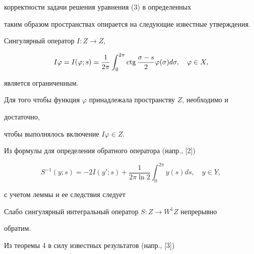 корректности задачи решения уравнения (3) в определенных 


таким образом пространствах опирается на следующие известные утверждения. 


 


\begin{lemnonum} 


Сингулярный оператор $I:Z\to Z$, 


$$ 


I\varphi=I(\varphi;s)=\frac{1}{2\pi}\int^{2\pi}_0 


\ctg\frac{\sigma-s}{2}\varphi(\sigma)d\sigma,\quad 


\varphi\in X, 


$$ 


является ограниченным. 


\end{lemnonum} 


 


\begin{cornonum} 


Для того чтобы функция $\varphi$ принадлежала пространству $Z$, необходимо и 


достаточно, 


чтобы выполнялось включение $I\varphi\in Z$. 


\end{cornonum} 


 


Из формулы для определения обратного оператора (напр., [2]) 


$$ 


S^{-1}(y;s)=-2I(y';s)+\frac{1}{2\pi\ln 2}\int^{2\pi}_0 


y(s)d s,\quad y\in Y, 


$$ 


с учетом леммы и ее следствия следует 


 


\begin{thm} 


Слабо сингулярный интегральный оператор $S:Z\to W^1Z$ непрерывно 


обратим. 


\end{thm} 


 


Из теоремы 4 в силу известных результатов (напр., [3]) 


